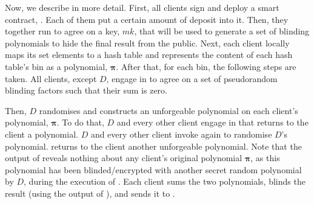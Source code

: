 %


%
%


Now, we describe \fpsi in more detail. First, all clients sign and deploy a  smart contract, \scf. Each of them put a certain amount of deposit into it. Then, they together run \ct to agree on a key, $mk$, that will be used to generate a set of blinding polynomials to hide the final result from the public. Next, each client locally maps its set elements to a hash table and represents the content of each hash table's bin as a polynomial, $\bm\pi$. After that, for each bin, the following steps are taken.  All clients, except $D$, engage in \zspaa to agree on a set of pseudorandom blinding factors such that their sum is zero.  %

Then, $D$ randomises and constructs an unforgeable polynomial on each client's polynomial, $\bm\pi$. To do that, $D$ and every other client engage in \vopr that returns to the client a polynomial. $D$ and every other client invoke \vopr again to randomise $D$'s polynomial. \vopr returns to the client another unforgeable polynomial. Note that the output of \vopr reveals nothing about any client's original polynomial $\bm\pi$, as this polynomial has been blinded/encrypted with another secret random polynomial by $D$, during the execution of \vopr. Each client sums the two polynomials,  blinds the result (using the output of  \zspaa), and sends it to \scf. 



